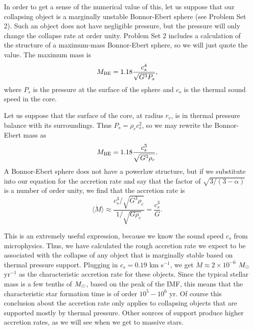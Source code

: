 In order to get a sense of the numerical value of this, let us suppose that our collapsing object is a marginally unstable Bonnor-Ebert sphere (see Problem Set 2). Such an object does not have negligible pressure, but the pressure will only change the collapse rate at order unity. Problem Set 2 includes a calculation of the structure of a maximum-mass Bonnor-Ebert sphere, so we will just quote the value. The maximum mass is
\begin{equation}
M_{\rm BE} = 1.18 \frac{c_s^4}{\sqrt{G^3 P_s}},
\end{equation}
where $P_s$ is the pressure at the surface of the sphere and $c_s$ is the thermal sound speed in the core.

Let us suppose that the surface of the core, at radius $r_c$, is in thermal pressure balance with its surroundings. Thus $P_s = \rho_c c_s^2$, so we may rewrite the Bonnor-Ebert mass as
\begin{equation}
M_{\rm BE} = 1.18 \frac{c_s^3}{\sqrt{G^3 \rho_c}}.
\end{equation}
A Bonnor-Ebert sphere does not have a powerlaw structure, but if we substitute into our equation for the accretion rate and say that the factor of $\sqrt{3/(3-\alpha)}$ is a number of order unity, we find that the accretion rate is
\begin{equation}
\langle\dot{M}\rangle \approx \frac{c_s^3/\sqrt{G^3\rho_c}}{1/\sqrt{G\rho_c}} = \frac{c_s^3}{G}.
\end{equation}

This is an extremely useful expression, because we know the sound speed $c_s$ from microphysics. Thus, we have calculated the rough accretion rate we expect to be associated with the collapse of any object that is marginally stable based on thermal pressure support. Plugging in $c_s=0.19$ km s$^{-1}$, we get $\dot{M} \approx 2\times 10^{-6}$ $M_{\odot}$ yr$^{-1}$ as the characteristic accretion rate for these objects. Since the typical stellar mass is a few tenths of $M_{\odot}$, based on the peak of the IMF, this means that the characteristic star formation time is of order $10^5-10^6$ yr. Of course this conclusion about the accretion rate only applies to collapsing objects that are supported mostly by thermal pressure. Other sources of support produce higher accretion rates, as we will see when we get to massive stars.


